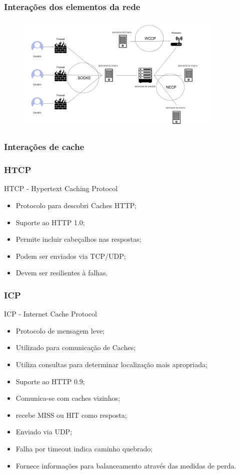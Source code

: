 \subsubsection{Intera\c{c}\~oes dos elementos da rede}
\begin{figure}[h]
\includegraphics[width=10cm]{Figuras/protocolos_interacao_elementos.png} 
\label{figura:protocolos_interacao_elementos}
\end{figure}

\subsubsection{Intera\c{c}\~oes de cache}

\subsubsection{HTCP}
HTCP - Hypertext Caching Protocol
\begin{itemize}
\item Protocolo para descobri Caches HTTP;
\item Suporte ao HTTP 1.0;
\item Permite incluir cabeçalhos nas respostas;
\item Podem ser enviados via TCP/UDP;
\item Devem ser resilientes \`a falhas.
\end{itemize}

\subsubsection{ICP}
ICP - Internet Cache Protocol
\begin{itemize}
\item Protocolo de mensagem leve;
\item Utilizado para comunica\c{c}\~ao de Caches;
\item Utiliza consultas para determinar localiza\c{c}\~ao mais apropriada;
\item Suporte ao HTTP 0.9;
\item Comunica-se com caches vizinhos;
\item recebe MISS ou HIT como resposta;
\item Enviado via UDP;
\item Falha por timeout indica caminho quebrado;
\item Fornece informa\c{c}\~oes para balanceamento atrav\'es das medidas de perda.
\end{itemize}

